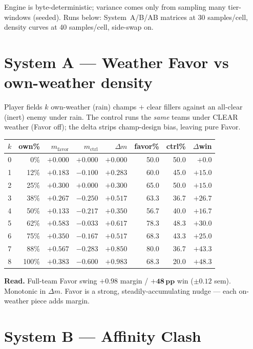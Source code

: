 \documentclass[11pt]{article}
\newcommand{\bl}[1]{\textcolor{blue!65!black}{#1}}
\begin{document}
Engine is byte-deterministic; variance comes only from sampling many tier-windows
(seeded). Runs below: System~A/B/AB matrices at 30 samples/cell, density curves at
40 samples/cell, side-swap on.

\section{System A --- Weather Favor vs own-weather density}

Player fields $k$ own-weather (rain) champs $+$ clear fillers against an all-clear
(inert) enemy under rain. The control runs the \emph{same} teams under CLEAR weather
(Favor off); the delta strips champ-design bias, leaving pure Favor.

\begin{center}
\begin{tabular}{r r r r r r r r}
\hline
$k$ & own\% & $m_{\text{favor}}$ & $m_{\text{ctrl}}$ & \textbf{$\Delta m$} & favor\% & ctrl\% & \textbf{$\Delta$win} \\
\hline
0 &   0\% & $+0.000$ & $+0.000$ & $+0.000$ & 50.0 & 50.0 & $+0.0$ \\
1 &  12\% & $+0.183$ & $-0.100$ & $+0.283$ & 60.0 & 45.0 & $+15.0$ \\
2 &  25\% & $+0.300$ & $+0.000$ & $+0.300$ & 65.0 & 50.0 & $+15.0$ \\
3 &  38\% & $+0.267$ & $-0.250$ & $+0.517$ & 63.3 & 36.7 & $+26.7$ \\
4 &  50\% & $+0.133$ & $-0.217$ & $+0.350$ & 56.7 & 40.0 & $+16.7$ \\
5 &  62\% & $+0.583$ & $-0.033$ & $+0.617$ & 78.3 & 48.3 & $+30.0$ \\
6 &  75\% & $+0.350$ & $-0.167$ & $+0.517$ & 68.3 & 43.3 & $+25.0$ \\
7 &  88\% & $+0.567$ & $-0.283$ & $+0.850$ & 80.0 & 36.7 & $+43.3$ \\
8 & 100\% & $+0.383$ & $-0.600$ & \bl{$+0.983$} & 68.3 & 20.0 & \bl{$+48.3$} \\
\hline
\end{tabular}
\end{center}

\textbf{Read.} Full-team Favor swing $\mathbf{+0.98}$ margin / $\mathbf{+48\,pp}$ win
($\pm0.12$ sem). Monotonic in $\Delta m$. Favor is a strong, steadily-accumulating
nudge --- each on-weather piece adds margin.

\section{System B --- Affinity Clash}
\end{document}
